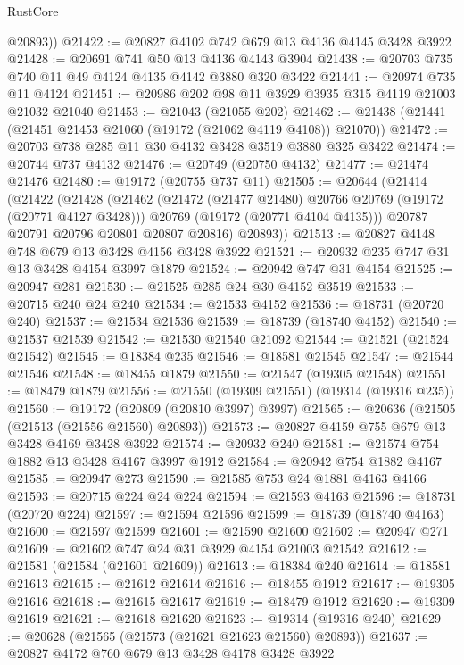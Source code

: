 \begin{lexlean}{RustCore}
\begin{coremodule}
        @20893))
@21422 := @20827 @4102 @742 @679 @13 @4136 @4145 @3428 @3922
@21428 := @20691 @741 @50 @13 @4136 @4143 @3904
@21438 := @20703 @735 @740 @11 @49 @4124 @4135 @4142 @3880 @320 @3422
@21441 := @20974 @735 @11 @4124
@21451 := @20986 @202 @98 @11 @3929 @3935 @315 @4119 @21003 @21032 @21040
@21453 := @21043 (@21055 @202)
@21462 := @21438 (@21441 (@21451 @21453 @21060 (@19172 (@21062 @4119 @4108)) @21070))
@21472 := @20703 @738 @285 @11 @30 @4132 @3428 @3519 @3880 @325 @3422
@21474 := @20744 @737 @4132
@21476 := @20749 (@20750 @4132)
@21477 := @21474 @21476
@21480 := @19172 (@20755 @737 @11)
@21505 := @20644
    (@21414
      (@21422
        (@21428
          (@21462
            (@21472 (@21477 @21480) @20766 @20769 (@19172 (@20771 @4127 @3428)))
            @20769
            (@19172 (@20771 @4104 @4135)))
          @20787
          @20791
          @20796
          @20801
          @20807
          @20816)
        @20893))
@21513 := @20827 @4148 @748 @679 @13 @3428 @4156 @3428 @3922
@21521 := @20932 @235 @747 @31 @13 @3428 @4154 @3997 @1879
@21524 := @20942 @747 @31 @4154
@21525 := @20947 @281
@21530 := @21525 @285 @24 @30 @4152 @3519
@21533 := @20715 @240 @24 @240
@21534 := @21533 @4152
@21536 := @18731 (@20720 @240)
@21537 := @21534 @21536
@21539 := @18739 (@18740 @4152)
@21540 := @21537 @21539
@21542 := @21530 @21540 @21092
@21544 := @21521 (@21524 @21542)
@21545 := @18384 @235
@21546 := @18581 @21545
@21547 := @21544 @21546
@21548 := @18455 @1879
@21550 := @21547 (@19305 @21548)
@21551 := @18479 @1879
@21556 := @21550 (@19309 @21551) (@19314 (@19316 @235))
@21560 := @19172 (@20809 (@20810 @3997) @3997)
@21565 := @20636 (@21505 (@21513 (@21556 @21560) @20893))
@21573 := @20827 @4159 @755 @679 @13 @3428 @4169 @3428 @3922
@21574 := @20932 @240
@21581 := @21574 @754 @1882 @13 @3428 @4167 @3997 @1912
@21584 := @20942 @754 @1882 @4167
@21585 := @20947 @273
@21590 := @21585 @753 @24 @1881 @4163 @4166
@21593 := @20715 @224 @24 @224
@21594 := @21593 @4163
@21596 := @18731 (@20720 @224)
@21597 := @21594 @21596
@21599 := @18739 (@18740 @4163)
@21600 := @21597 @21599
@21601 := @21590 @21600
@21602 := @20947 @271
@21609 := @21602 @747 @24 @31 @3929 @4154 @21003 @21542
@21612 := @21581 (@21584 (@21601 @21609))
@21613 := @18384 @240
@21614 := @18581 @21613
@21615 := @21612 @21614
@21616 := @18455 @1912
@21617 := @19305 @21616
@21618 := @21615 @21617
@21619 := @18479 @1912
@21620 := @19309 @21619
@21621 := @21618 @21620
@21623 := @19314 (@19316 @240)
@21629 := @20628 (@21565 (@21573 (@21621 @21623 @21560) @20893))
@21637 := @20827 @4172 @760 @679 @13 @3428 @4178 @3428 @3922

\end{coremodule}
\end{lexlean}
